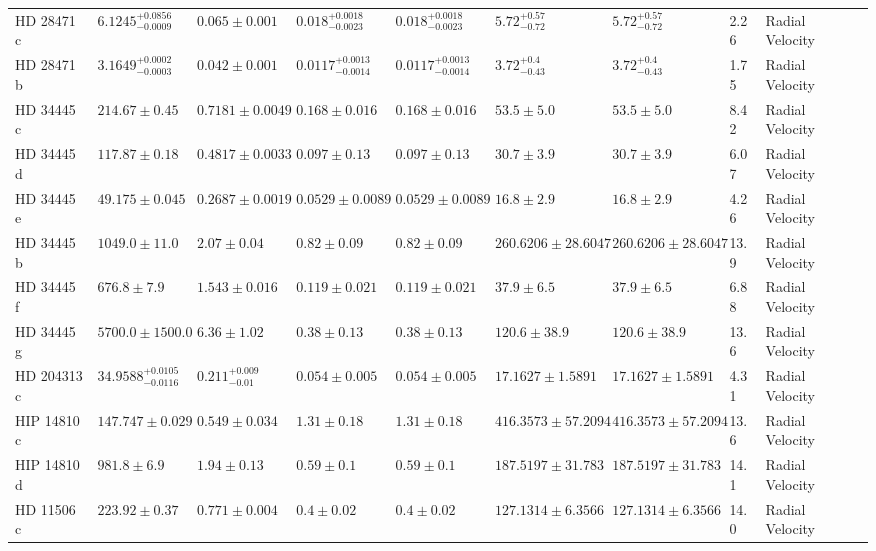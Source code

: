 \begin{tabular}{llllllllll}
HD 28471 c & $6.1245^{+0.0856}_{-0.0009}$ & $0.065 \pm 0.001$ & $0.018^{+0.0018}_{-0.0023}$ & $0.018^{+0.0018}_{-0.0023}$ & $5.72^{+0.57}_{-0.72}$ & $5.72^{+0.57}_{-0.72}$ & 2.26 & Radial Velocity & \cite{STEVENSON_ET_AL_2025} \\
HD 28471 b & $3.1649^{+0.0002}_{-0.0003}$ & $0.042 \pm 0.001$ & $0.0117^{+0.0013}_{-0.0014}$ & $0.0117^{+0.0013}_{-0.0014}$ & $3.72^{+0.4}_{-0.43}$ & $3.72^{+0.4}_{-0.43}$ & 1.75 & Radial Velocity & \cite{STEVENSON_ET_AL_2025} \\
HD 34445 c & $214.67 \pm 0.45$ & $0.7181 \pm 0.0049$ & $0.168 \pm 0.016$ & $0.168 \pm 0.016$ & $53.5 \pm 5.0$ & $53.5 \pm 5.0$ & 8.42 & Radial Velocity & \cite{VOGT_ET_AL__2017} \\
HD 34445 d & $117.87 \pm 0.18$ & $0.4817 \pm 0.0033$ & $0.097 \pm 0.13$ & $0.097 \pm 0.13$ & $30.7 \pm 3.9$ & $30.7 \pm 3.9$ & 6.07 & Radial Velocity & \cite{VOGT_ET_AL__2017} \\
HD 34445 e & $49.175 \pm 0.045$ & $0.2687 \pm 0.0019$ & $0.0529 \pm 0.0089$ & $0.0529 \pm 0.0089$ & $16.8 \pm 2.9$ & $16.8 \pm 2.9$ & 4.26 & Radial Velocity & \cite{VOGT_ET_AL__2017} \\
HD 34445 b & $1049.0 \pm 11.0$ & $2.07 \pm 0.04$ & $0.82 \pm 0.09$ & $0.82 \pm 0.09$ & $260.6206 \pm 28.6047$ & $260.6206 \pm 28.6047$ & 13.9 & Radial Velocity & \cite{STASSUN_ET_AL__2017} \\
HD 34445 f & $676.8 \pm 7.9$ & $1.543 \pm 0.016$ & $0.119 \pm 0.021$ & $0.119 \pm 0.021$ & $37.9 \pm 6.5$ & $37.9 \pm 6.5$ & 6.88 & Radial Velocity & \cite{VOGT_ET_AL__2017} \\
HD 34445 g & $5700.0 \pm 1500.0$ & $6.36 \pm 1.02$ & $0.38 \pm 0.13$ & $0.38 \pm 0.13$ & $120.6 \pm 38.9$ & $120.6 \pm 38.9$ & 13.6 & Radial Velocity & \cite{VOGT_ET_AL__2017} \\
HD 204313 c & $34.9588^{+0.0105}_{-0.0116}$ & $0.211^{+0.009}_{-0.01}$ & $0.054 \pm 0.005$ & $0.054 \pm 0.005$ & $17.1627 \pm 1.5891$ & $17.1627 \pm 1.5891$ & 4.31 & Radial Velocity & \cite{FENG_ET_AL__2022} \\
HIP 14810 c & $147.747 \pm 0.029$ & $0.549 \pm 0.034$ & $1.31 \pm 0.18$ & $1.31 \pm 0.18$ & $416.3573 \pm 57.2094$ & $416.3573 \pm 57.2094$ & 13.6 & Radial Velocity & \cite{MENT_ET_AL__2018} \\
HIP 14810 d & $981.8 \pm 6.9$ & $1.94 \pm 0.13$ & $0.59 \pm 0.1$ & $0.59 \pm 0.1$ & $187.5197 \pm 31.783$ & $187.5197 \pm 31.783$ & 14.1 & Radial Velocity & \cite{MENT_ET_AL__2018} \\
HD 11506 c & $223.92 \pm 0.37$ & $0.771 \pm 0.004$ & $0.4 \pm 0.02$ & $0.4 \pm 0.02$ & $127.1314 \pm 6.3566$ & $127.1314 \pm 6.3566$ & 14.0 & Radial Velocity & \cite{RUGGIERI_ET_AL__2024} \\

\end{tabular}
